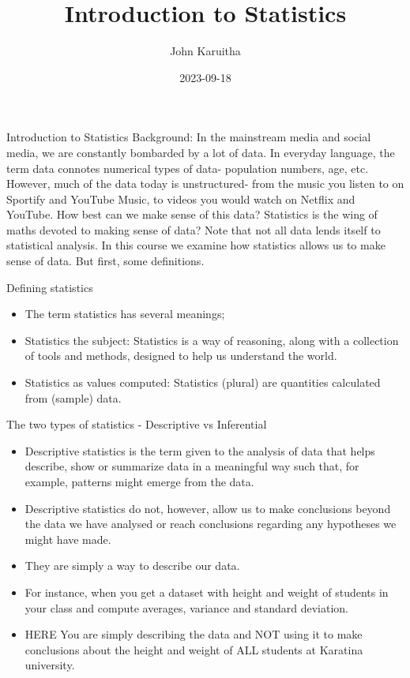 \documentclass[
  ignorenonframetext,
]{beamer}
\title{Introduction to Statistics}
\author{John Karuitha}
\date{2023-09-18}
\begin{document}
\frame{\titlepage}

\begin{frame}{Introduction to Statistics}
\protect\hypertarget{introduction-to-statistics}{}
Background: In the mainstream media and social media, we are constantly
bombarded by a lot of data. In everyday language, the term data connotes
numerical types of data- population numbers, age, etc. However, much of
the data today is unstructured- from the music you listen to on Sportify
and YouTube Music, to videos you would watch on Netflix and YouTube. How
best can we make sense of this data? Statistics is the wing of maths
devoted to making sense of data? Note that not all data lends itself to
statistical analysis. In this course we examine how statistics allows us
to make sense of data. But first, some definitions.
\end{frame}

\begin{frame}{Defining statistics}
\protect\hypertarget{defining-statistics}{}
\begin{itemize}
\item
  The term statistics has several meanings;
\item
  Statistics the subject: Statistics is a way of reasoning, along with a
  collection of tools and methods, designed to help us understand the
  world.
\item
  Statistics as values computed: Statistics (plural) are quantities
  calculated from (sample) data.
\end{itemize}
\end{frame}

\begin{frame}{The two types of statistics - Descriptive vs Inferential}
\protect\hypertarget{the-two-types-of-statistics---descriptive-vs-inferential}{}
\begin{itemize}
\item
  Descriptive statistics is the term given to the analysis of data that
  helps describe, show or summarize data in a meaningful way such that,
  for example, patterns might emerge from the data.
\item
  Descriptive statistics do not, however, allow us to make conclusions
  beyond the data we have analysed or reach conclusions regarding any
  hypotheses we might have made.
\item
  They are simply a way to describe our data.
\item
  For instance, when you get a dataset with height and weight of
  students in your class and compute averages, variance and standard
  deviation.
\item
  HERE You are simply describing the data and NOT using it to make
  conclusions about the height and weight of ALL students at Karatina
  university.
\end{itemize}
\end{frame}
\end{document}
